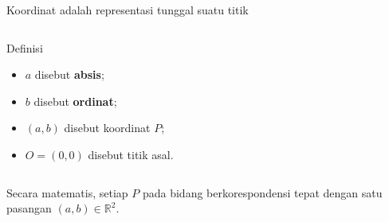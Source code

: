 \documentclass[aspectratio=169,11pt]{beamer}
\newcommand{\axisgrid}[4]{%
    \draw[step=1cm,gray!20,very thin] (#1,#3) grid (#2,#4);
    \draw[-{Latex[length=2mm]},AcademicBlue,thick] (#1,0)--({#2+0.25},0) node[right] {$x$};
    \draw[-{Latex[length=2mm]},AcademicBlue,thick] (0,#3)--(0,{#4+0.25}) node[above] {$y$};
}
\begin{document}
\begin{frame}{Koordinat adalah representasi tunggal suatu titik}
    \begin{columns}[c]
        \centering

        \begin{block}{Definisi}
            \begin{itemize}
                \item $a$ disebut \textbf{absis};
                \item $b$ disebut \textbf{ordinat};
                \item $(a,b)$ disebut koordinat $P$;
                \item $O=(0,0)$ disebut titik asal.
            \end{itemize}
        \end{block}
    \end{columns}

    Secara matematis, setiap $P$ pada bidang berkorespondensi tepat dengan satu
    pasangan $(a,b)\in\mathbb{R}^2$.
    
\end{frame}
\end{document}
